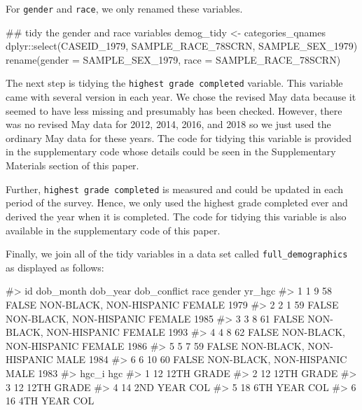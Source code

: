 For \texttt{gender} and \texttt{race}, we only renamed these variables.

\begin{Schunk}
\begin{Sinput}
## tidy the gender and race variables
demog_tidy <- categories_qnames %
  dplyr::select(CASEID_1979,
         SAMPLE_RACE_78SCRN,
         SAMPLE_SEX_1979) %
  rename(gender = SAMPLE_SEX_1979,
         race = SAMPLE_RACE_78SCRN)
\end{Sinput}
\end{Schunk}

The next step is tidying the \texttt{highest\ grade\ completed}
variable. This variable came with several version in each year. We chose
the revised May data because it seemed to have less missing and
presumably has been checked. However, there was no revised May data for
2012, 2014, 2016, and 2018 so we just used the ordinary May data for
these years. The code for tidying this variable is provided in the
supplementary code whose details could be seen in the Supplementary
Materials section of this paper.

Further, \texttt{highest\ grade\ completed} is measured and could be
updated in each period of the survey. Hence, we only used the highest
grade completed ever and derived the year when it is completed. The code
for tidying this variable is also available in the supplementary code of
this paper.

Finally, we join all of the tidy variables in a data set called
\texttt{full\_demographics} as displayed as follows:

\begin{Schunk}
\begin{Soutput}
#>   id dob_month dob_year dob_conflict                    race gender yr_hgc
#> 1  1         9       58        FALSE NON-BLACK, NON-HISPANIC FEMALE   1979
#> 2  2         1       59        FALSE NON-BLACK, NON-HISPANIC FEMALE   1985
#> 3  3         8       61        FALSE NON-BLACK, NON-HISPANIC FEMALE   1993
#> 4  4         8       62        FALSE NON-BLACK, NON-HISPANIC FEMALE   1986
#> 5  5         7       59        FALSE NON-BLACK, NON-HISPANIC   MALE   1984
#> 6  6        10       60        FALSE NON-BLACK, NON-HISPANIC   MALE   1983
#>   hgc_i          hgc
#> 1    12   12TH GRADE
#> 2    12   12TH GRADE
#> 3    12   12TH GRADE
#> 4    14 2ND YEAR COL
#> 5    18 6TH YEAR COL
#> 6    16 4TH YEAR COL
\end{Soutput}
\end{Schunk}

